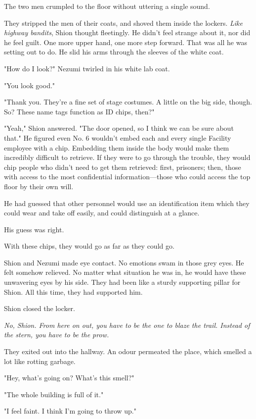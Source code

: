 The two men crumpled to the floor without uttering a single sound.

They stripped the men of their coats, and shoved them inside the
lockers. \emph{Like highway bandits}, Shion thought fleetingly. He didn't feel
strange about it, nor did he feel guilt. One more upper hand, one more
step forward. That was all he was setting out to do. He slid his arms
through the sleeves of the white coat.

"How do I look?" Nezumi twirled in his white lab coat.

"You look good."

"Thank you. They're a fine set of stage costumes. A little on the big
side, though. So? These name tags function as ID chips, then?"

"Yeah," Shion answered. "The door opened, so I think we can be sure
about that." He figured even No. 6 wouldn't embed each and every single
Facility employee with a chip. Embedding them inside the body would make
them incredibly difficult to retrieve. If they were to go through the
trouble, they would chip people who didn't need to get them retrieved:
first, prisoners; then, those with access to the most confidential
information---those who could access the top floor by their own will.

He had guessed that other personnel would use an identification item
which they could wear and take off easily, and could distinguish at a
glance.

His guess was right.

With these chips, they would go as far as they could go.

Shion and Nezumi made eye contact. No emotions swam in those grey eyes.
He felt somehow relieved. No matter what situation he was in, he would
have these unwavering eyes by his side. They had been like a sturdy
supporting pillar for Shion. All this time, they had supported him.

Shion closed the locker.

\emph{No, Shion. From here on out, you have to be the one to blaze the trail.
Instead of the stern, you have to be the prow.}

They exited out into the hallway. An odour permeated the place, which
smelled a lot like rotting garbage.

"Hey, what's going on? What's this smell?"

"The whole building is full of it."

"I feel faint. I think I'm going to throw up."

